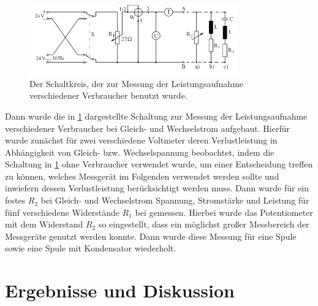 \documentclass[
	a4paper,
	12pt,
	pagesize,
	ngerman
]{scrartcl}
\begin{document}
	\begin{figure}[tb]
		\includegraphics[width=0.8\textwidth]{Schaltkreis2}
		\centering
		\caption{Der Schaltkreis, der zur Messung der Leistungsaufnahme verschiedener Verbraucher benutzt wurde.}
		\label{SK2}
		\centering
	\end{figure}
	
	Dann wurde die in \cref{SK2} dargestellte Schaltung zur Messung der Leistungsaufnahme verschiedener Verbraucher bei Gleich- und Wechselstrom aufgebaut.
	Hierfür wurde zunächst für zwei verschiedene Voltmeter deren Verlustleistung in Abhängigkeit von Gleich- bzw. Wechselspannung beobachtet, indem die Schaltung in \cref{SK2} ohne Verbraucher verwendet wurde, um einer Entscheidung treffen zu können, welches Messgerät im Folgenden verwendet werden sollte und inwiefern dessen Verlustleistung berücksichtigt werden muss.
	Dann wurde für ein festes $ R_2 $ bei Gleich- und Wechselstrom Spannung, Stromstärke und Leistung für fünf verschiedene Widerstände $ R_1 $ bei gemessen.
	Hierbei wurde das Potentiometer mit dem Widerstand $ R_2 $ so eingestellt, dass ein möglichst großer Messbereich der Messgeräte genutzt werden konnte.
	Dann wurde diese Messung für eine Spule sowie eine Spule mit Kondensator wiederholt. 
	
	\section{Ergebnisse und Diskussion}
\end{document}
